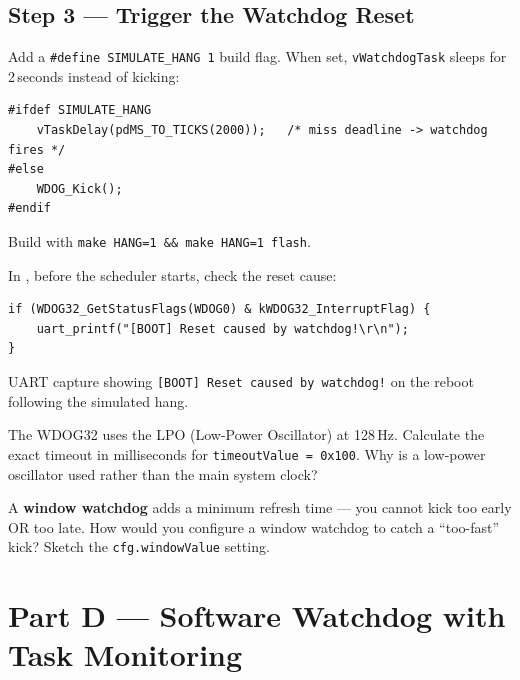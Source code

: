 \documentclass[11pt, a4paper]{article}
\begin{document}
\subsection{Step 3 --- Trigger the Watchdog Reset}

Add a \texttt{\#define SIMULATE\_HANG 1} build flag. When set, \texttt{vWatchdogTask}
sleeps for 2\,seconds instead of kicking:

\begin{lstlisting}[style=cstyle]
#ifdef SIMULATE_HANG
    vTaskDelay(pdMS_TO_TICKS(2000));   /* miss deadline -> watchdog fires */
#else
    WDOG_Kick();
#endif
\end{lstlisting}

Build with \texttt{make HANG=1 \&\& make HANG=1 flash}.

In , before the scheduler starts, check the reset cause:

\begin{lstlisting}[style=cstyle]
if (WDOG32_GetStatusFlags(WDOG0) & kWDOG32_InterruptFlag) {
    uart_printf("[BOOT] Reset caused by watchdog!\r\n");
}
\end{lstlisting}

\begin{checkpointbox}[~C]
  UART capture showing \texttt{[BOOT] Reset caused by watchdog!} on the reboot
  following the simulated hang.
\end{checkpointbox}

\begin{questionbox}[~C1]
  The WDOG32 uses the LPO (Low-Power Oscillator) at 128\,Hz. Calculate the exact
  timeout in milliseconds for \texttt{timeoutValue = 0x100}. Why is a low-power
  oscillator used rather than the main system clock?
\end{questionbox}

\begin{questionbox}[~C2]
  A \textbf{window watchdog} adds a minimum refresh time --- you cannot kick too early
  OR too late. How would you configure a window watchdog to catch a ``too-fast'' kick?
  Sketch the \texttt{cfg.windowValue} setting.
\end{questionbox}

\section{Part D --- Software Watchdog with Task Monitoring}
\end{document}

